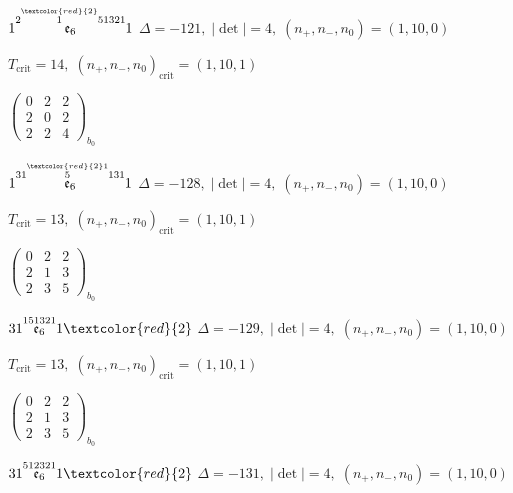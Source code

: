 \documentclass[10pt]{article}
\begin{document}
\smallskip

$1\overset{2\overset{\textcolor{red}{2}}{1}51321}{\mathfrak{e}_6}1$ \quad $\Delta=-121,\; |\det|=4,\; (n_+,n_-,n_0)=(1,10,0)$

\hspace{1em}$T_{\text{crit}}=14,\; (n_+,n_-,n_0)_{\text{crit}}=(1,10,1)$

\hspace{2em}$\left(\begin{smallmatrix}0 & 2 & 2 \\ 2 & 0 & 2 \\ 2 & 2 & 4\end{smallmatrix}\right)_{\!b_0}$

\smallskip

$1\overset{31\overset{\textcolor{red}{2}1}{5}131}{\mathfrak{e}_6}1$ \quad $\Delta=-128,\; |\det|=4,\; (n_+,n_-,n_0)=(1,10,0)$

\hspace{1em}$T_{\text{crit}}=13,\; (n_+,n_-,n_0)_{\text{crit}}=(1,10,1)$

\hspace{2em}$\left(\begin{smallmatrix}0 & 2 & 2 \\ 2 & 1 & 3 \\ 2 & 3 & 5\end{smallmatrix}\right)_{\!b_0}$

\smallskip

$31\overset{151321}{\mathfrak{e}_6}1\textcolor{red}{2}$ \quad $\Delta=-129,\; |\det|=4,\; (n_+,n_-,n_0)=(1,10,0)$

\hspace{1em}$T_{\text{crit}}=13,\; (n_+,n_-,n_0)_{\text{crit}}=(1,10,1)$

\hspace{2em}$\left(\begin{smallmatrix}0 & 2 & 2 \\ 2 & 1 & 3 \\ 2 & 3 & 5\end{smallmatrix}\right)_{\!b_0}$

\smallskip

$31\overset{512321}{\mathfrak{e}_6}1\textcolor{red}{2}$ \quad $\Delta=-131,\; |\det|=4,\; (n_+,n_-,n_0)=(1,10,0)$
\end{document}
